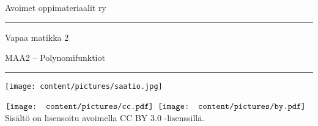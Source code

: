 
\vspace*{2cm}

\begin{center}
    \sffamily
    \begin{doublespace}
        \begin{LARGE}
            Avoimet oppimateriaalit ry
        \end{LARGE}
      
        \vspace{1cm}
        \hrule height 2pt
        \vspace{1.5cm}
        \begin{Huge}
            Vapaa matikka 2
        \end{Huge}
      
        \vfill
      
        \begin{LARGE}
            MAA2 -- Polynomifunktiot
        \end{LARGE}
        \vspace{1.5cm}
        \hrule height 2pt
        \vspace{1cm}
        \texttt{[image: content/pictures/saatio.jpg]}
    \end{doublespace}
\end{center}

\vspace{2cm}

\begin{flushright}
    \sffamily
    $\vcenter{\hbox{\texttt{[image: content/pictures/cc.pdf]}}}$
    $\vcenter{\hbox{\texttt{[image: content/pictures/by.pdf]}}}$
    Sisältö on lisensoitu avoimella CC BY 3.0 -lisenssillä.
\end{flushright}
